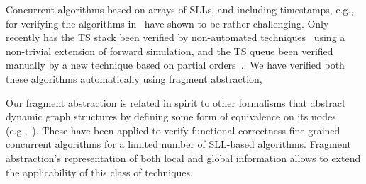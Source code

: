 Concurrent algorithms based on arrays of SLLs, and including timestamps, e.g.,
for verifying the algorithms in~\cite{ts-stack} have shown to be rather challenging. Only
recently has the TS stack been verified by non-automated
techniques~\cite{BEEM:cav17} using a non-trivial extension of
forward simulation, and the TS queue been verified manually by a new technique
based on partial orders~\cite{Khyzha:esop17,singh:issre16}..
We have verified both these algorithms automatically using fragment abstraction,

Our fragment abstraction is related in spirit to other formalisms that
abstract dynamic graph structures by defining some form of equivalence on
its nodes (e.g.,~\cite{spotlight07,SRW:threevalued,boxes13}). These have
been applied to verify functional correctness fine-grained concurrent
algorithms for a limited number of SLL-based algorithms. Fragment
abstraction's representation of both local and global information allows to
extend the applicability of this class of techniques.



